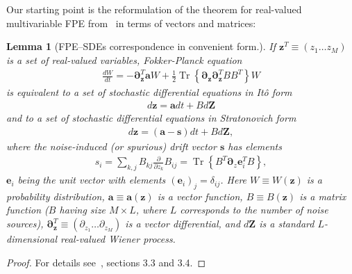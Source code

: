 \documentclass[12pt,aip,jmp,amssymb,amsmath]{revtex4-1}
\newtheorem{lemma}{Lemma}
\begin{document}
Our starting point is the reformulation of the theorem for real-valued multivariable FPE from~\cite{Risken1996} in terms of vectors and matrices:

\begin{lemma}[FPE--SDEs correspondence in convenient form.]
\label{lmm:app-fpe:fpe-sde-real}
    If $\boldsymbol{z}^T \equiv (z_1 \ldots z_M)$ is a set of real-valued variables,
    Fokker-Planck equation
    \begin{equation*}\begin{split}
        \frac{dW}{dt}
        = -\boldsymbol{\partial}_{\boldsymbol{z}}^T \boldsymbol{a} W
        + \frac{1}{2} \operatorname{Tr} \left\{ \boldsymbol{\partial}_{\boldsymbol{z}} \boldsymbol{\partial}_{\boldsymbol{z}}^T B B^T \right\} W
    \end{split}\end{equation*}
    is equivalent to a set of stochastic differential equations in It\^{o} form
    \begin{equation*}\begin{split}
        d\boldsymbol{z} = \boldsymbol{a} dt + B d\boldsymbol{Z}
    \end{split}\end{equation*}
    and to a set of stochastic differential equations in Stratonovich form
    \begin{equation*}\begin{split}
        d\boldsymbol{z} = (\boldsymbol{a} - \boldsymbol{s})dt + B d\boldsymbol{Z},
    \end{split}\end{equation*}
    where the noise-induced (or spurious) drift vector $\boldsymbol{s}$ has elements
    \begin{equation*}\begin{split}
        s_i
        = \sum_{k,j} B_{kj} \frac{\partial}{\partial z_k} B_{ij}
        = \operatorname{Tr} \left\{ B^T \boldsymbol{\partial}_z \boldsymbol{e}_i^T B \right\},
    \end{split}\end{equation*}
    $\boldsymbol{e}_i$ being the unit vector with elements $(\boldsymbol{e}_i)_j = \delta_{ij}$.
    Here $W \equiv W(\boldsymbol{z})$ is a probability distribution,
    $\boldsymbol{a} \equiv \boldsymbol{a}(\boldsymbol{z})$ is a vector function,
    $B \equiv B(\boldsymbol{z})$ is a matrix function ($B$ having size $M \times L$, where $L$ corresponds to the number of noise sources),
    $\boldsymbol{\partial}_{\boldsymbol{z}}^T \equiv (\partial_{z_1} \ldots \partial_{z_M})$ is a vector differential,
    and $d\boldsymbol{Z}$ is a standard $L$-dimensional real-valued Wiener process.
\end{lemma}
\begin{proof}
For details see~\cite{Risken1996}, sections 3.3 and 3.4.
\end{proof}
\end{document}

